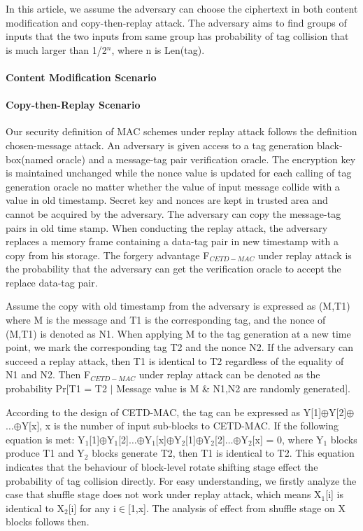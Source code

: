 \documentclass{article}
\begin{document}
In this article, we assume the adversary can choose the ciphertext in both content modification and copy-then-replay attack. The adversary aims to find groups of inputs that the two inputs from same group has probability of tag collision that is much larger than 1/2$^n$, where n is Len(tag). 


\paragraph{Content Modification Scenario}
\paragraph{Copy-then-Replay Scenario}
Our security definition of MAC schemes under replay attack follows the definition chosen-message attack. 
An adversary is given access to a tag generation black-box(named oracle) and a message-tag pair verification oracle. The encryption key is maintained unchanged while the nonce value is updated for each calling of tag generation oracle no matter whether the value of input message collide with a value in old timestamp. Secret key and nonces are kept in trusted area and cannot be acquired by the adversary. The adversary can copy the message-tag pairs in old time stamp. When conducting the replay attack, the adversary replaces a memory frame containing a data-tag pair in new timestamp with a copy from his storage. The forgery advantage F$_{CETD-MAC}$ under replay attack is the probability that the adversary can get the verification oracle to accept the replace data-tag pair.  

Assume the copy with old timestamp from the adversary is expressed as (M,T1) where M is the message and T1 is the corresponding tag, and the nonce of (M,T1) is denoted as N1. When applying M to the tag generation at a new time point, we mark the corresponding tag T2 and the nonce N2. If the adversary can succeed a replay attack, then T1 is identical to T2 regardless of the equality of N1 and N2.
Then F$_{CETD-MAC}$ under replay attack can be denoted as the probability Pr[T1 = T2 $\mid$ Message value is M \& N1,N2 are randomly generated]. 

According to the design of CETD-MAC, the tag can be expressed as Y[1]$\oplus$Y[2]$\oplus$$\ldots$$\oplus$Y[x], x is the number of input sub-blocks to CETD-MAC. If the following equation is met:
Y$_1$[1]$\oplus$Y$_1$[2]$\ldots$$\oplus$Y$_1$[x]$\oplus$Y$_2$[1]$\oplus$Y$_2$[2]$\ldots$$\oplus$Y$_2$[x] = 0, where Y$_1$ blocks produce T1 and Y$_2$ blocks generate T2, then T1 is identical to T2. This equation indicates that the behaviour of block-level rotate shifting stage effect the probability of tag collision directly. For easy understanding, we firstly analyze the case that shuffle stage does not work under replay attack, which means X$_1$[i] is identical to X$_2$[i] for any i$\in$[1,x]. The analysis of effect from shuffle stage on X blocks follows then.
\end{document}
